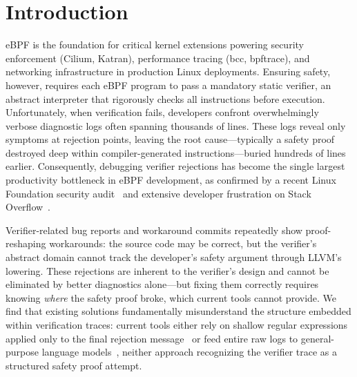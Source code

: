 \documentclass[sigplan,10pt,anonymous,review]{acmart}
\begin{document}
\maketitle

\section{Introduction}
\label{sec:intro}

eBPF is the foundation for critical kernel extensions powering security
enforcement (Cilium, Katran), performance tracing (bcc, bpftrace), and
networking infrastructure in production Linux deployments. Ensuring safety,
however, requires each eBPF program to pass a mandatory static verifier, an
abstract interpreter that rigorously checks all instructions before execution.
Unfortunately, when verification fails, developers confront overwhelmingly
verbose diagnostic logs often spanning thousands of lines. These logs reveal
only symptoms at rejection points, leaving the root cause---typically a safety
proof destroyed deep within compiler-generated instructions---buried hundreds
of lines earlier. Consequently, debugging verifier rejections has become the
single largest productivity bottleneck in eBPF development, as confirmed by a
recent Linux Foundation security audit~\cite{nccaudit2024} and extensive
developer frustration on Stack Overflow~\cite{deokar2024}.

Verifier-related bug reports and workaround commits repeatedly show
proof-reshaping workarounds: the source code may be correct, but the verifier's
abstract domain cannot track the developer's safety argument through LLVM's
lowering.  These rejections are inherent to the verifier's design and cannot
be eliminated by better diagnostics alone---but fixing them correctly
requires knowing \emph{where} the safety proof broke, which current tools
cannot provide. We find that
existing solutions fundamentally misunderstand the structure embedded within
verification traces: current tools either rely on shallow regular expressions
applied only to the final rejection message~\cite{prettyverifier2025} or feed
entire raw logs to general-purpose language
models~\cite{kgent2024}, neither approach recognizing the verifier trace as a
structured safety proof attempt.
\label{sec:intro-gap}
\end{document}
